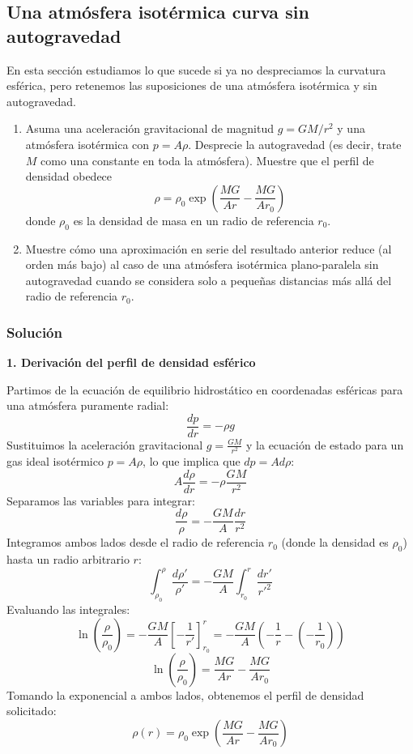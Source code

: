 \figuraFamiliaPerfilesLosa

\subsection{Una atmósfera isotérmica curva sin autogravedad}

En esta sección estudiamos lo que sucede si ya no despreciamos la curvatura esférica, pero retenemos las suposiciones de una atmósfera isotérmica y sin autogravedad.

\begin{enumerate}
    \item Asuma una aceleración gravitacional de magnitud $g = GM/r^2$ y una atmósfera isotérmica con $p = A\rho$. Desprecie la autogravedad (es decir, trate $M$ como una constante en toda la atmósfera). Muestre que el perfil de densidad obedece
    $$ \rho = \rho_0 \exp\left(\frac{MG}{Ar} - \frac{MG}{Ar_0}\right) $$
    donde $\rho_0$ es la densidad de masa en un radio de referencia $r_0$.

    \item Muestre cómo una aproximación en serie del resultado anterior reduce (al orden más bajo) al caso de una atmósfera isotérmica plano-paralela sin autogravedad cuando se considera solo a pequeñas distancias más allá del radio de referencia $r_0$.
\end{enumerate}

\subsubsection{Solución}

\textbf{1. Derivación del perfil de densidad esférico}

Partimos de la ecuación de equilibrio hidrostático en coordenadas esféricas para una atmósfera puramente radial:
$$ \frac{dp}{dr} = -\rho g $$
Sustituimos la aceleración gravitacional $g = \frac{GM}{r^2}$ y la ecuación de estado para un gas ideal isotérmico $p = A\rho$, lo que implica que $dp = A d\rho$:
$$ A \frac{d\rho}{dr} = -\rho \frac{GM}{r^2} $$
Separamos las variables para integrar:
$$ \frac{d\rho}{\rho} = -\frac{GM}{A} \frac{dr}{r^2} $$
Integramos ambos lados desde el radio de referencia $r_0$ (donde la densidad es $\rho_0$) hasta un radio arbitrario $r$:
$$ \int_{\rho_0}^{\rho} \frac{d\rho'}{\rho'} = -\frac{GM}{A} \int_{r_0}^{r} \frac{dr'}{r'^2} $$
Evaluando las integrales:
$$ \ln\left(\frac{\rho}{\rho_0}\right) = -\frac{GM}{A} \left[ -\frac{1}{r'} \right]_{r_0}^{r} = -\frac{GM}{A} \left( -\frac{1}{r} - \left(-\frac{1}{r_0}\right) \right) $$
$$ \ln\left(\frac{\rho}{\rho_0}\right) = \frac{MG}{Ar} - \frac{MG}{Ar_0} $$
Tomando la exponencial a ambos lados, obtenemos el perfil de densidad solicitado:
$$ \rho(r) = \rho_0 \exp\left(\frac{MG}{Ar} - \frac{MG}{Ar_0}\right) $$

